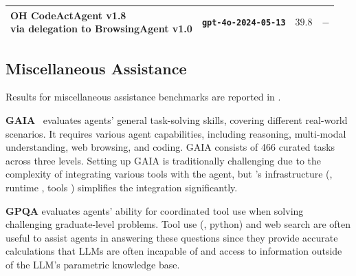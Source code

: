 {\begin{table}[t]
\begin{adjustbox}{max width=\textwidth}
\begin{tabular}{l|l|rr}
\midrule

\makecell[l]{OH CodeActAgent v1.8\\ {\small via \textbf{delegation} to BrowsingAgent v1.0}}
& \texttt{gpt-4o-2024-05-13} & $39.8$ & $-$ \\

\bottomrule
\end{tabular}
\end{adjustbox}
\vspace{-0.5cm}
\label{tab:web_browsing}
\end{table}
}

\subsection{Miscellaneous Assistance}
\label{sec:eval_misc_assistance}

Results for miscellaneous assistance benchmarks are reported in . 

\textbf{GAIA}~\citep{gaia} evaluates agents' general task-solving skills, covering different real-world scenarios.
It requires various agent capabilities, including reasoning, multi-modal understanding, web browsing, and coding. 
GAIA consists of 466 curated tasks across three levels.
Setting up GAIA is traditionally challenging due to the complexity of integrating various tools with the agent, but 
\projname's infrastructure (\eg, runtime , tools ) simplifies the integration significantly. 

\textbf{GPQA} \citep{rein2023gpqa} evaluates agents' ability for coordinated tool use when solving challenging graduate-level problems.
Tool use (\eg, python) and web search are often useful to assist agents in answering these questions since they provide accurate calculations that LLMs are often incapable of and access to information outside of the LLM's parametric knowledge base.


